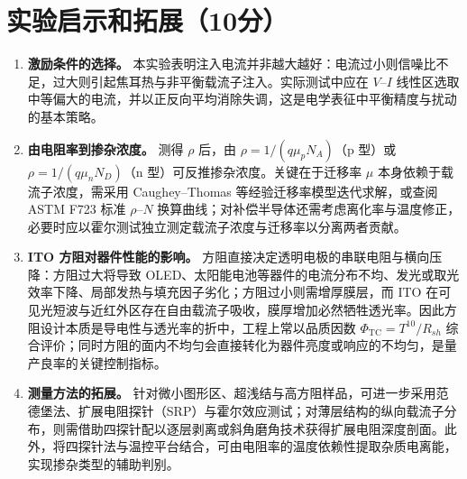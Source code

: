 \documentclass[12pt,a4paper]{ctexart}
\begin{document}
\section*{实验启示和拓展（10分）}
\begin{enumerate}
    \item \textbf{激励条件的选择。} 本实验表明注入电流并非越大越好：电流过小则信噪比不足，过大则引起焦耳热与非平衡载流子注入。实际测试中应在 $V$–$I$ 线性区选取中等偏大的电流，并以正反向平均消除失调，这是电学表征中平衡精度与扰动的基本策略。

    \item \textbf{由电阻率到掺杂浓度。} 测得 $\rho$ 后，由 $\rho=1/(q\mu_p N_A)$（p 型）或 $\rho=1/(q\mu_n N_D)$（n 型）可反推掺杂浓度。关键在于迁移率 $\mu$ 本身依赖于载流子浓度，需采用 Caughey--Thomas 等经验迁移率模型迭代求解，或查阅 ASTM F723 标准 $\rho$–$N$ 换算曲线；对补偿半导体还需考虑离化率与温度修正，必要时应以霍尔测试独立测定载流子浓度与迁移率以分离两者贡献。

    \item \textbf{ITO 方阻对器件性能的影响。} 方阻直接决定透明电极的串联电阻与横向压降：方阻过大将导致 OLED、太阳能电池等器件的电流分布不均、发光或取光效率下降、局部发热与填充因子劣化；方阻过小则需增厚膜层，而 ITO 在可见光短波与近红外区存在自由载流子吸收，膜厚增加必然牺牲透光率。因此方阻设计本质是导电性与透光率的折中，工程上常以品质因数 $\Phi_{\mathrm{TC}}=T^{10}/R_{sh}$ 综合评价；同时方阻的面内不均匀会直接转化为器件亮度或响应的不均匀，是量产良率的关键控制指标。

    \item \textbf{测量方法的拓展。} 针对微小图形区、超浅结与高方阻样品，可进一步采用范德堡法、扩展电阻探针（SRP）与霍尔效应测试；对薄层结构的纵向载流子分布，则需借助四探针配以逐层剥离或斜角磨角技术获得扩展电阻深度剖面。此外，将四探针法与温控平台结合，可由电阻率的温度依赖性提取杂质电离能，实现掺杂类型的辅助判别。
\end{enumerate}
\end{document}
